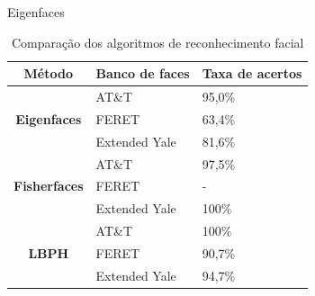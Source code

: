 \begin{frame}{Eigenfaces}
\begin{table}[htbp]
\centering
\caption{Comparação dos algoritmos de reconhecimento facial}
\label{tab:compara_reconhecimento}
\begin{tabular}{|c|l|l|}
\hline
\textbf{Método}                       & \textbf{Banco de faces} & \textbf{Taxa de acertos} \\\hline
\multirow{3}{*}{\textbf{Eigenfaces}}  & AT\&T                   & 95,0\%                   \\
                                      & FERET                   & 63,4\%                   \\
                                      & Extended Yale           & 81,6\%                   \\\hline
\multirow{3}{*}{\textbf{Fisherfaces}} & AT\&T                   & 97,5\%                   \\
                                      & FERET                   & -                        \\
                                      & Extended Yale           & 100\%                    \\\hline
\multirow{3}{*}{\textbf{LBPH}}        & AT\&T                   & 100\%                    \\
                                      & FERET                   & 90,7\%                   \\
                                      & Extended Yale           & 94,7\%                   \\\hline
\end{tabular}
\end{table}
\end{frame}